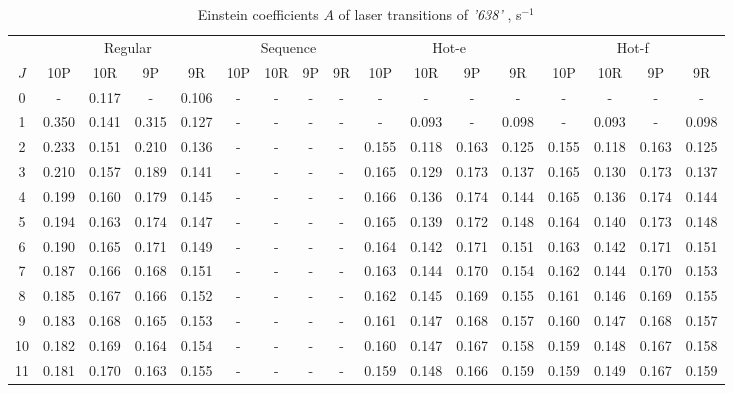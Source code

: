 \documentclass{report}
\begin{document}
\begin{appendices}
\begin{table}
\centering
\caption{Einstein coefficients $A$ of laser transitions of \textit{'638'} , s$^{-1}$}
\label{table:A638}
\scriptsize
\begin{tabular}{|c|cccc|cccc|cccc|cccc|}
\hline
& \multicolumn{4}{c|}{Regular}& \multicolumn{4}{c|}{Sequence}& \multicolumn{4}{c|}{Hot-e}& \multicolumn{4}{c|}{Hot-f}\\
$J$ & 10P & 10R & 9P & 9R & 10P & 10R & 9P & 9R & 10P & 10R & 9P & 9R & 10P & 10R & 9P & 9R\\ 
\hline
0  &   -   & 0.117 &   -   & 0.106 &   -   &   -   &   -   &   -   &   -   &   -   &   -   &   -   &   -   &   -   &   -   &   -  \\
1  & 0.350 & 0.141 & 0.315 & 0.127 &   -   &   -   &   -   &   -   &   -   & 0.093 &   -   & 0.098 &   -   & 0.093 &   -   & 0.098\\
2  & 0.233 & 0.151 & 0.210 & 0.136 &   -   &   -   &   -   &   -   & 0.155 & 0.118 & 0.163 & 0.125 & 0.155 & 0.118 & 0.163 & 0.125\\
3  & 0.210 & 0.157 & 0.189 & 0.141 &   -   &   -   &   -   &   -   & 0.165 & 0.129 & 0.173 & 0.137 & 0.165 & 0.130 & 0.173 & 0.137\\
4  & 0.199 & 0.160 & 0.179 & 0.145 &   -   &   -   &   -   &   -   & 0.166 & 0.136 & 0.174 & 0.144 & 0.165 & 0.136 & 0.174 & 0.144\\
5  & 0.194 & 0.163 & 0.174 & 0.147 &   -   &   -   &   -   &   -   & 0.165 & 0.139 & 0.172 & 0.148 & 0.164 & 0.140 & 0.173 & 0.148\\
6  & 0.190 & 0.165 & 0.171 & 0.149 &   -   &   -   &   -   &   -   & 0.164 & 0.142 & 0.171 & 0.151 & 0.163 & 0.142 & 0.171 & 0.151\\
7  & 0.187 & 0.166 & 0.168 & 0.151 &   -   &   -   &   -   &   -   & 0.163 & 0.144 & 0.170 & 0.154 & 0.162 & 0.144 & 0.170 & 0.153\\
8  & 0.185 & 0.167 & 0.166 & 0.152 &   -   &   -   &   -   &   -   & 0.162 & 0.145 & 0.169 & 0.155 & 0.161 & 0.146 & 0.169 & 0.155\\
9  & 0.183 & 0.168 & 0.165 & 0.153 &   -   &   -   &   -   &   -   & 0.161 & 0.147 & 0.168 & 0.157 & 0.160 & 0.147 & 0.168 & 0.157\\
10 & 0.182 & 0.169 & 0.164 & 0.154 &   -   &   -   &   -   &   -   & 0.160 & 0.147 & 0.167 & 0.158 & 0.159 & 0.148 & 0.167 & 0.158\\
11 & 0.181 & 0.170 & 0.163 & 0.155 &   -   &   -   &   -   &   -   & 0.159 & 0.148 & 0.166 & 0.159 & 0.159 & 0.149 & 0.167 & 0.159\\

\end{tabular}
\end{table}
\end{appendices}
\end{document}
